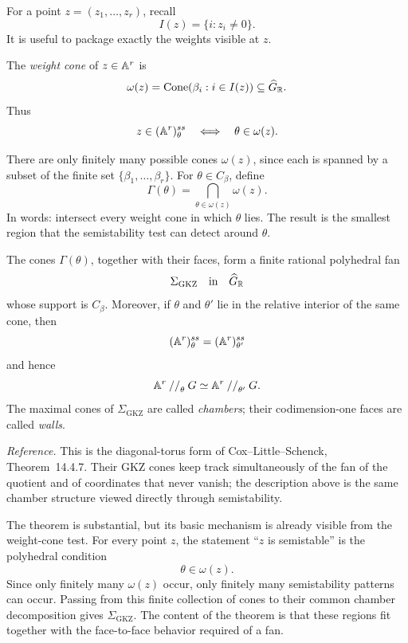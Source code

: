 For a point \(z=(z_1,\dots,z_r)\), recall
\[
I(z)=\{i:z_i\neq0\}.
\]
It is useful to package exactly the weights visible at \(z\).

\begin{definition}
The \emph{weight cone} of \(z\in\mathbb{A}^r\) is
\[
\omega(z)
=
\operatorname{Cone}(\beta_i:i\in I(z))
\subseteq\widehat G_{\mathbb{R}}.
\]
Thus
\[
z\in(\mathbb{A}^r)^{ss}_\theta
\quad\Longleftrightarrow\quad
\theta\in\omega(z).
\]
\end{definition}

There are only finitely many possible cones \(\omega(z)\), since each is
spanned by a subset of the finite set \(\{\beta_1,\dots,\beta_r\}\).
For \(\theta\in C_\beta\), define
\[
\Gamma(\theta)
=
\bigcap_{\theta\in\omega(z)}\omega(z).
\]
In words: intersect every weight cone in which \(\theta\) lies.  The
result is the smallest region that the semistability test can detect
around \(\theta\).

\begin{theorem}
\label{thm:secondary-fan}
The cones \(\Gamma(\theta)\), together with their faces, form a finite
rational polyhedral fan
\[
\Sigma_{\mathrm{GKZ}}
\quad\text{in}\quad
\widehat G_{\mathbb{R}}
\]
whose support is \(C_\beta\).  Moreover, if \(\theta\) and \(\theta'\)
lie in the relative interior of the same cone, then
\[
(\mathbb{A}^r)^{ss}_\theta
=
(\mathbb{A}^r)^{ss}_{\theta'}
\]
and hence
\[
\mathbb{A}^r\mathbin{//}_\theta G
\simeq
\mathbb{A}^r\mathbin{//}_{\theta'}G.
\]
The maximal cones of \(\Sigma_{\mathrm{GKZ}}\) are called
\emph{chambers}; their codimension-one faces are called \emph{walls}.
\end{theorem}

\noindent
\textit{Reference.}
This is the diagonal-torus form of Cox--Little--Schenck,
Theorem~14.4.7.  Their GKZ cones keep track simultaneously of the fan
of the quotient and of coordinates that never vanish; the description
above is the same chamber structure viewed directly through
semistability.

The theorem is substantial, but its basic mechanism is already visible
from the weight-cone test.  For every point \(z\), the statement
``\(z\) is semistable'' is the polyhedral condition
\[
\theta\in\omega(z).
\]
Since only finitely many \(\omega(z)\) occur, only finitely many
semistability patterns can occur.  Passing from this finite collection
of cones to their common chamber decomposition gives
\(\Sigma_{\mathrm{GKZ}}\).  The content of the theorem is that these
regions fit together with the face-to-face behavior required of a fan.

